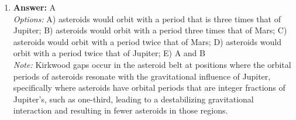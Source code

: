 \documentclass[12pt]{article}
\begin{document}
\begin{enumerate}[label=\arabic*.]
\item \textbf{Answer:} A
\\ \textit{Options:} A) asteroids would orbit with a period that is three times that of Jupiter; B) asteroids would orbit with a period three times that of Mars; C) asteroids would orbit with a period twice that of Mars; D) asteroids would orbit with a period twice that of Jupiter; E) A and B
\\ \textit{Note:} Kirkwood gaps occur in the asteroid belt at positions where the orbital periods of asteroids resonate with the gravitational influence of Jupiter, specifically where asteroids have orbital periods that are integer fractions of Jupiter's, such as one-third, leading to a destabilizing gravitational interaction and resulting in fewer asteroids in those regions.
\end{enumerate}
\end{document}
